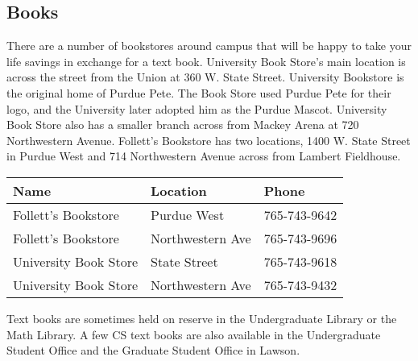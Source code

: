 \subsection{Books}

There are a number of bookstores around campus that will be happy to take your life savings in exchange for a text book. University Book Store's main location is across the street from the Union at 360 W. State Street. University Bookstore is the original home of Purdue Pete. The Book Store used Purdue Pete for their logo, and the University later adopted him as the Purdue Mascot. University Book Store also has a smaller branch across from Mackey Arena at 720 Northwestern Avenue. Follett's Bookstore has two locations, 1400 W. State Street in Purdue West and 714 Northwestern Avenue across from Lambert Fieldhouse.

\begin{table}[H]
	\centering
	\begin{tabular}{@{}lll@{}}
		\toprule
		\textbf{Name} & \textbf{Location} & \textbf{Phone} \\
		\midrule
		Follett's Bookstore & Purdue West & 765-743-9642 \\
		Follett's Bookstore & Northwestern Ave & 765-743-9696 \\
		University Book Store & State Street & 765-743-9618 \\
		University Book Store & Northwestern Ave & 765-743-9432 \\
		\bottomrule
	\end{tabular}
\end{table}

Text books are sometimes held on reserve in the Undergraduate Library or the Math Library. A few CS text books are also available in the Undergraduate Student Office and the Graduate Student Office in Lawson.

